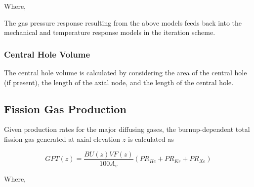 Where,

The gas pressure response resulting from the above models feeds back into the mechanical and
temperature response models in the iteration scheme.

\subsubsection{Central Hole Volume} \label{section:central-hole-volume}

The central hole volume is calculated by considering the area of the central hole (if present), the
length of the axial node, and the length of the central hole.

\subsection{Fission Gas Production} \label{section:fission-gas-production}

Given production rates for the major diffusing gases, the burnup-dependent total fission gas
generated at axial elevation $ z $ is calculated as

\begin{equation}
    \label{eq:fission_gas_production_rate}
    GPT\left( z \right) = \frac{BU\left( z \right)VF\left( z \right)}{100A_{v}}\left( PR_{He} + PR_{Kr} + PR_{Xe} \right)
\end{equation}

Where,

